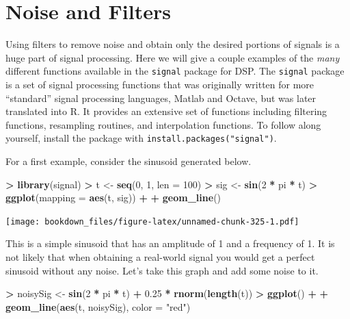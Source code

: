 \documentclass[]{krantz}
\makeatletter
\newenvironment{Shaded}{\begin{snugshade}}{\end{snugshade}}
\newcommand{\KeywordTok}[1]{\textcolor[rgb]{0.27,0.27,0.27}{\textbf{#1}}}
\newcommand{\DataTypeTok}[1]{\textcolor[rgb]{0.27,0.27,0.27}{#1}}
\newcommand{\DecValTok}[1]{\textcolor[rgb]{0.06,0.06,0.06}{#1}}
\newcommand{\FloatTok}[1]{\textcolor[rgb]{0.06,0.06,0.06}{#1}}
\newcommand{\StringTok}[1]{\textcolor[rgb]{0.5,0.5,0.5}{#1}}
\newcommand{\OperatorTok}[1]{\textcolor[rgb]{0.43,0.43,0.43}{\textbf{#1}}}
\newcommand{\NormalTok}[1]{#1}
\newenvironment{kframe}{%
\medskip{}
\setlength{\fboxsep}{.8em}
 \def\at@end@of@kframe{}%
 \ifinner\ifhmode%
  \def\at@end@of@kframe{\end{minipage}}%
  \begin{minipage}{\columnwidth}%
 \fi\fi%
 \def\FrameCommand##1{\hskip\@totalleftmargin \hskip-\fboxsep
 \colorbox{shadecolor}{##1}\hskip-\fboxsep
     \hskip-\linewidth \hskip-\@totalleftmargin \hskip\columnwidth}%
 \MakeFramed {\advance\hsize-\width
   \@totalleftmargin\z@ \linewidth\hsize
   \@setminipage}}%
 {\par\unskip\endMakeFramed%
 \at@end@of@kframe}
\renewenvironment{Shaded}{\begin{kframe}}{\end{kframe}}
\makeatother
\begin{document}
\section{Noise and Filters}\label{noise-and-filters}

Using filters to remove noise and obtain only the desired portions of
signals is a huge part of signal processing. Here we will give a couple
examples of the \emph{many} different functions available in the
\texttt{signal} package for DSP. The \texttt{signal} package is a set of
signal processing functions that was originally written for more
``standard'' signal processing languages, Matlab and Octave, but was
later translated into R. It provides an extensive set of functions
including filtering functions, resampling routines, and interpolation
functions. To follow along yourself, install the package with
\texttt{install.packages("signal")}.

For a first example, consider the sinusoid generated below.

\begin{Shaded}
\begin{Highlighting}[]
\OperatorTok{>}\StringTok{ }\KeywordTok{library}\NormalTok{(signal)}
\OperatorTok{>}\StringTok{ }\NormalTok{t <-}\StringTok{ }\KeywordTok{seq}\NormalTok{(}\DecValTok{0}\NormalTok{, }\DecValTok{1}\NormalTok{, }\DataTypeTok{len =} \DecValTok{100}\NormalTok{)}
\OperatorTok{>}\StringTok{ }\NormalTok{sig <-}\StringTok{ }\KeywordTok{sin}\NormalTok{(}\DecValTok{2} \OperatorTok{*}\StringTok{ }\NormalTok{pi }\OperatorTok{*}\StringTok{ }\NormalTok{t)}
\OperatorTok{>}\StringTok{ }\KeywordTok{ggplot}\NormalTok{(}\DataTypeTok{mapping =} \KeywordTok{aes}\NormalTok{(t, sig)) }\OperatorTok{+}\StringTok{ }
\OperatorTok{+}\StringTok{   }\KeywordTok{geom_line}\NormalTok{()}
\end{Highlighting}
\end{Shaded}

\texttt{[image: bookdown\_files/figure-latex/unnamed-chunk-325-1.pdf]}

This is a simple sinusoid that has an amplitude of 1 and a frequency of
1. It is not likely that when obtaining a real-world signal you would
get a perfect sinusoid without any noise. Let's take this graph and add
some noise to it.

\begin{Shaded}
\begin{Highlighting}[]
\OperatorTok{>}\StringTok{ }\NormalTok{noisySig <-}\StringTok{ }\KeywordTok{sin}\NormalTok{(}\DecValTok{2} \OperatorTok{*}\StringTok{ }\NormalTok{pi }\OperatorTok{*}\StringTok{ }\NormalTok{t) }\OperatorTok{+}\StringTok{ }\FloatTok{0.25} \OperatorTok{*}\StringTok{ }\KeywordTok{rnorm}\NormalTok{(}\KeywordTok{length}\NormalTok{(t))}
\OperatorTok{>}\StringTok{ }\KeywordTok{ggplot}\NormalTok{() }\OperatorTok{+}\StringTok{ }
\OperatorTok{+}\StringTok{   }\KeywordTok{geom_line}\NormalTok{(}\KeywordTok{aes}\NormalTok{(t, noisySig), }\DataTypeTok{color =} \StringTok{"red"}\NormalTok{)}
\end{Highlighting}
\end{Shaded}
\end{document}
